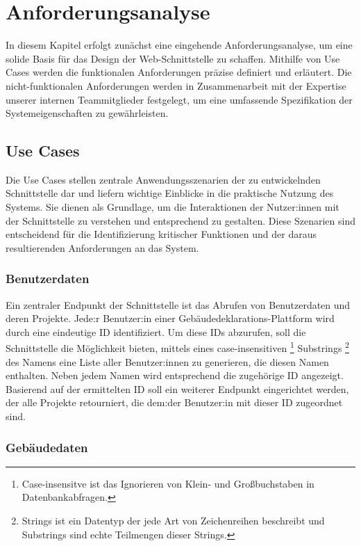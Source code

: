 \documentclass[draft,final]{vutinfth} %
\begin{document}
\chapter{Anforderungsanalyse}

In diesem Kapitel erfolgt zunächst eine eingehende Anforderungsanalyse, um eine solide Basis für das Design der Web-Schnittstelle zu schaffen. 
Mithilfe von Use Cases werden die funktionalen Anforderungen präzise definiert und erläutert. 
Die nicht-funktionalen Anforderungen werden in Zusammenarbeit mit der Expertise unserer internen Teammitglieder festgelegt, um eine umfassende Spezifikation der Systemeigenschaften zu gewährleisten.


\section{Use Cases}
\label{subsec:useCases}

Die Use Cases stellen zentrale Anwendungsszenarien der zu entwickelnden Schnittstelle dar und liefern wichtige Einblicke in die praktische Nutzung des Systems. 
Sie dienen als Grundlage, um die Interaktionen der Nutzer:innen mit der Schnittstelle zu verstehen und entsprechend zu gestalten. 
Diese Szenarien sind entscheidend für die Identifizierung kritischer Funktionen und der daraus resultierenden Anforderungen an das System.


\subsection{Benutzerdaten}

Ein zentraler Endpunkt der Schnittstelle ist das Abrufen von Benutzerdaten und deren Projekte. 
Jede:r Benutzer:in einer Gebäudedeklarations-Plattform wird durch eine eindeutige ID identifiziert. 
Um diese IDs abzurufen, soll die Schnittstelle die Möglichkeit bieten, mittels eines case-insensitiven 
\footnote{
	Case-insensitve ist das Ignorieren von Klein- und Großbuchstaben in Datenbankabfragen.
}
Substrings
\footnote{
	Strings ist ein Datentyp der jede Art von Zeichenreihen beschreibt und Substrings sind echte Teilmengen dieser Strings.
}
des Namens eine Liste aller Benutzer:innen zu generieren, die diesen Namen enthalten. Neben jedem Namen wird entsprechend die zugehörige ID angezeigt.
Basierend auf der ermittelten ID soll ein weiterer Endpunkt eingerichtet werden, der alle Projekte retourniert, die dem:der Benutzer:in mit dieser ID zugeordnet sind.


\subsection{Gebäudedaten}
\end{document}
